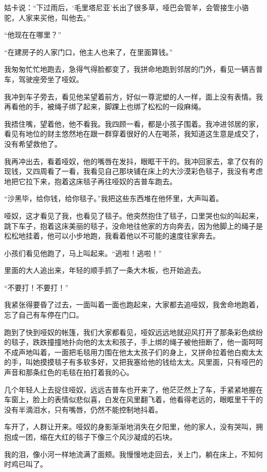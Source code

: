 \par 姑卡说：“下过雨后，‘毛里塔尼亚’长出了很多草，哑巴会管羊，会管接生小骆驼，人家来买他，叫他去。”
\par “他现在在哪里？”
\par “在建房子的人家门口，他主人也来了，在里面算钱。”
\par 我匆匆忙忙地跑去，急得气得脸都变了，我拼命地跑到邻居的门外，看见一辆吉普车，驾驶座旁坐了哑奴。
\par 我冲到车子旁去，看见他呆望着前方，好似一尊泥塑的人一样，面上没有表情。我再看他的手，被绳子绑了起来，脚踝上也绑了松松的一段麻绳。
\par 我捂住嘴，望着他，他不看我。我四顾一看，都是小孩子围着。我冲进邻居的家，看见有地位的财主悠然地在跟一群穿着很好的人在喝茶，我知道这生意是成交了，没有希望救他了。
\par 我再冲出去，看着哑奴，他的嘴唇在发抖，眼眶干干的。我冲回家去，拿了仅有的现钱，又四周看了一看，我看见自己那块铺在床上的大沙漠彩色毯子，我没有考虑地把它拉下来，抱着这床毯子再往哑奴的吉普车跑去。
\par “沙黑毕，给你钱，给你毯子。”我把这些东西堆在他怀里，大声叫着。
\par 哑奴，这才看见了我，也看见了毯子。他突然抱住了毯子，口里哭也似的叫起来，跳下车子，抱着这床美丽的毯子，没命地往他家的方向奔去，因为他脚上的绳子是松松地挂着，他可以小步地跑，我看着他以不可能的速度往家奔去。
\par 小孩们看见他跑了，马上叫起来。“逃啦！逃啦！”
\par 里面的大人追出来，年轻的顺手抓了一条大木板，也开始追去。
\par “不要打！不要打！”
\par 我紧张得要昏了过去，一面叫着一面也跑起来，大家都去追哑奴，我舍命地跑着，忘了自己有车停在门口。
\par 跑到了快到哑奴的帐篷，我们大家都看见，哑奴远远地就迎风打开了那条彩色缤纷的毯子，跌跌撞撞地扑向他的太太和孩子，手上绑的绳子被他扭断了，他一面呵呵不成声地叫着，一面把毛毯用力围在他太太孩子们的身上，又拼命拉着他白痴太太的手，叫她摸摸毯子有多软多好，又把我塞给他的钱给太太。风里面，只有哑巴的声音和那条红色的毛毯在拍打着我的心。
\par 几个年轻人上去捉住哑奴，远远吉普车也开来了，他茫茫然上了车，手紧紧地握在车窗上，脸上的表情似悲似喜，白发在风里翻飞着，他看得老远的，眼眶里干干的没有半滴泪水，只有嘴唇，仍然不能控制地抖着。
\par 车开了，人群让开来。哑奴的身影渐渐地消失在夕阳里，他的家人，没有哭叫，拥抱成一团，缩在大红的毯子下像三个风沙凝成的石块。
\par 我的泪，像小河一样地流满了面颊。我慢慢地走回去，关上门，躺在床上，不知何时鸡已叫了。



